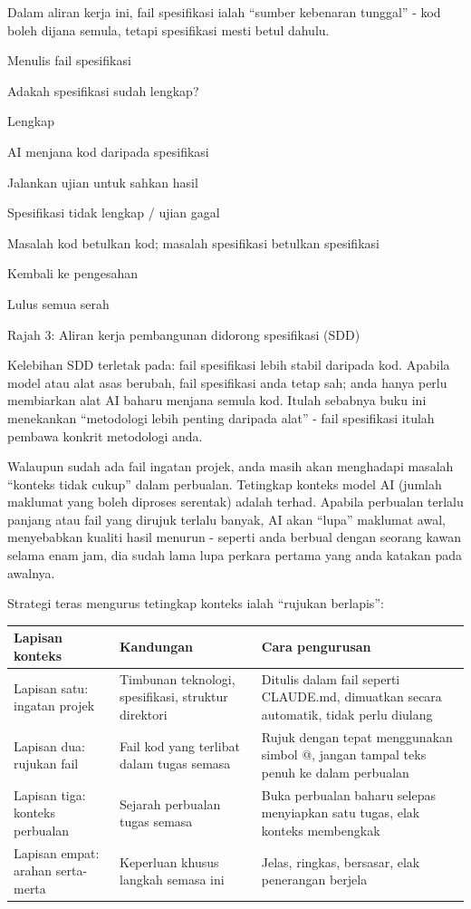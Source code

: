 Dalam aliran kerja ini, fail spesifikasi ialah “sumber kebenaran tunggal” - kod boleh dijana semula, tetapi spesifikasi mesti betul dahulu.

Menulis fail spesifikasi

Adakah spesifikasi sudah lengkap?

Lengkap

AI menjana kod daripada spesifikasi

Jalankan ujian untuk sahkan hasil

Spesifikasi tidak lengkap / ujian gagal

Masalah kod betulkan kod; masalah spesifikasi betulkan spesifikasi

Kembali ke pengesahan

Lulus semua serah

\begin{center}\small\color{gray}Rajah 3: Aliran kerja pembangunan didorong spesifikasi (SDD)\end{center}

Kelebihan SDD terletak pada: fail spesifikasi lebih stabil daripada kod. Apabila model atau alat asas berubah, fail spesifikasi anda tetap sah; anda hanya perlu membiarkan alat AI baharu menjana semula kod. Itulah sebabnya buku ini menekankan “metodologi lebih penting daripada alat” - fail spesifikasi itulah pembawa konkrit metodologi anda.


Walaupun sudah ada fail ingatan projek, anda masih akan menghadapi masalah “konteks tidak cukup” dalam perbualan. Tetingkap konteks model AI (jumlah maklumat yang boleh diproses serentak) adalah terhad. Apabila perbualan terlalu panjang atau fail yang dirujuk terlalu banyak, AI akan “lupa” maklumat awal, menyebabkan kualiti hasil menurun - seperti anda berbual dengan seorang kawan selama enam jam, dia sudah lama lupa perkara pertama yang anda katakan pada awalnya.

Strategi teras mengurus tetingkap konteks ialah “rujukan berlapis”:

\begin{center}
\begin{tabularx}{\linewidth}{|X|X|X|}
\hline
\textbf{Lapisan konteks} & \textbf{Kandungan} & \textbf{Cara pengurusan} \tabularnewline
\hline
Lapisan satu: ingatan projek & Timbunan teknologi, spesifikasi, struktur direktori & Ditulis dalam fail seperti CLAUDE.md, dimuatkan secara automatik, tidak perlu diulang \tabularnewline
Lapisan dua: rujukan fail & Fail kod yang terlibat dalam tugas semasa & Rujuk dengan tepat menggunakan simbol @, jangan tampal teks penuh ke dalam perbualan \tabularnewline
Lapisan tiga: konteks perbualan & Sejarah perbualan tugas semasa & Buka perbualan baharu selepas menyiapkan satu tugas, elak konteks membengkak \tabularnewline
Lapisan empat: arahan serta-merta & Keperluan khusus langkah semasa ini & Jelas, ringkas, bersasar, elak penerangan berjela \tabularnewline
\hline
\end{tabularx}
\end{center}

